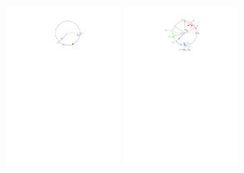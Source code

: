 \documentclass[11pt]{article}
\begin{document}
\includegraphics[width=0.25\textwidth]{Q2S1_Eq/lb_2.pdf}
\includegraphics[width=0.25\textwidth]{Q2S1_Eq/lb_3.pdf}
\end{document}
